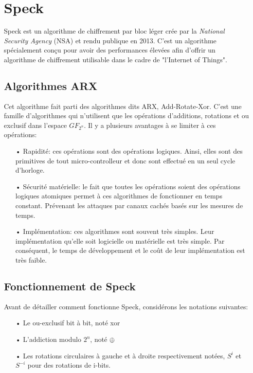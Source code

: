 	\section{Speck}

			Speck est un algorithme de chiffrement par bloc léger crée par la
		\textit{National Security Agency} (NSA) et rendu
		publique en 2013. C'est un algorithme spécialement conçu pour avoir des performances
		élevées afin d'offrir un algorithme de chiffrement utilisable dans le cadre de
		"l'Internet of Things".

		\subsection{Algorithmes ARX}

				Cet algorithme fait parti des algorithmes dits ARX, Add-Rotate-Xor. C'est une famille
			d'algorithmes qui n'utilisent que les opérations d'additions, rotations et ou exclusif
			dans l'espace $GF_{2^n}$. Il y a plusieurs avantages à se limiter à ces opérations:

			\begin{enumerate}
			\item[•] Rapidité: ces opérations sont des opérations logiques. Ainsi, elles sont
				des primitives de tout micro-controlleur et donc sont effectué en un seul
				cycle d'horloge.
			\item[•] Sécurité matérielle: le fait que toutes les opérations soient des opérations
				logiques atomiques permet à ces algorithmes de fonctionner en temps constant.
				Prévenant les attaques par canaux cachés basés sur les mesures de temps.
			\item[•] Implémentation: ces algorithmes sont souvent très simples. Leur implémentation
				qu'elle soit logicielle ou matérielle est très simple. Par conséquent, le
				temps de développement et le coût de leur implémentation est très faible.
			\end{enumerate}

		\subsection{Fonctionnement de Speck}

			Avant de détailler comment fonctionne Speck, considérons les notations suivantes:

			\begin{enumerate}
			  \item[•] Le ou-exclusif bit à bit, noté xor
			  \item[•] L'addiction modulo $2^n$, noté $\mathbin{\oplus}$
			  \item[•] Les rotations circulaires à gauche et à droite respectivement notées,
			    $S^i$ et $S^{-i}$ pour des rotations de i-bits.
			\end{enumerate}

